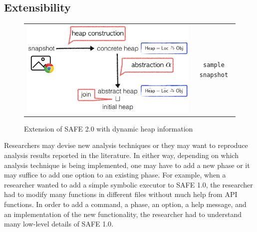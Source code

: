 \documentclass[10pt, conference]{IEEEtran}
\newcommand{\oldsafe}{{SAFE 1.0}\xspace}
\newcommand{\safe}{{SAFE 2.0}\xspace}
\begin{document}
\subsection{Extensibility}
\setcounter{figure}{2}
\begin{figure}[t]
\begin{tabular}{c|c|}\cline{2-2}
\begin{minipage}{.52\textwidth}
\includegraphics[width=\textwidth]{seip}
\end{minipage}
&
\begin{minipage}{.44\textwidth}
\small
\begin{verbatim}
sample snapshot
\end{verbatim}
\end{minipage}
\\\cline{2-2}
\end{tabular}
\vspace*{.5em}
\caption{\small Extension of \safe with dynamic heap information~\cite{safehybrid}}
\label{fig:seip}
\end{figure}

Researchers may devise new analysis techniques or they may want to
reproduce analysis results reported in the literature.  In either way,
depending on which analysis technique is being implemented, one may
have to add a new phase or it may suffice to add one option to an
existing phase.  For example, when a researcher wanted to add
a simple symbolic executor to \oldsafe, the researcher had to modify
many functions in different files without much help from API functions.
In order to add a command, a phase, an option, a help message, and an
implementation of the new functionality, the researcher had to understand
many low-level details of \oldsafe.
\end{document}
